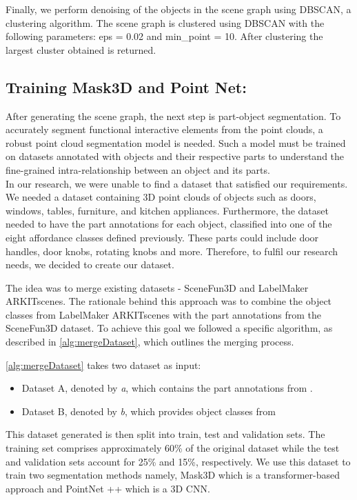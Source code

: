 Finally, we perform denoising of the objects in the scene graph using DBSCAN, a clustering algorithm. The scene graph is clustered using DBSCAN with the following parameters:
eps = 0.02 and min\_point = 10. After clustering the largest cluster obtained is returned. 

\subsection{Training Mask3D and Point Net:}
After generating the scene graph, the next step is part-object segmentation. To accurately segment functional interactive 
elements from the point clouds, a robust point cloud segmentation model is needed. Such a model
must be trained on datasets annotated with objects and their respective parts to understand the fine-grained intra-relationship 
between an object and its parts. \\
In our research, we were unable to find a dataset that satisfied our requirements. We needed a dataset containing 3D point clouds
 of objects such as doors, windows, tables, furniture, and kitchen appliances. Furthermore, the dataset needed to have 
 the part annotations for each object, classified into one of the eight affordance classes defined previously. 
 These parts could include door handles, door knobs, rotating knobs and more.  Therefore,
to fulfil our research needs, we decided to create our dataset.

The idea was to merge existing datasets - SceneFun3D and LabelMaker ARKITscenes. The rationale behind this approach was 
to combine the object classes from LabelMaker ARKITscenes with the part annotations from the SceneFun3D dataset. 
To achieve this goal we followed a specific algorithm, as described in \cref{alg:mergeDataset}, which outlines the merging process.

\cref{alg:mergeDataset} takes two dataset as input: 
\begin{itemize}
  \item Dataset A, denoted by \textit{a}, which contains the part annotations from \cite{delitzas2024scenefun3d}.
  \item Dataset B, denoted by \textit{b}, which provides object classes from \cite{ji2024arkitlabelmakernewscale} 
\end{itemize}

This dataset generated is then split into train, test and validation sets. The training set comprises approximately 60\% of the original dataset 
while the test and validation sets account for 25\% and 15\%, respectively. We use this dataset to train two segmentation methods 
namely, Mask3D which is a transformer-based approach and PointNet ++ which is a 3D CNN. 

